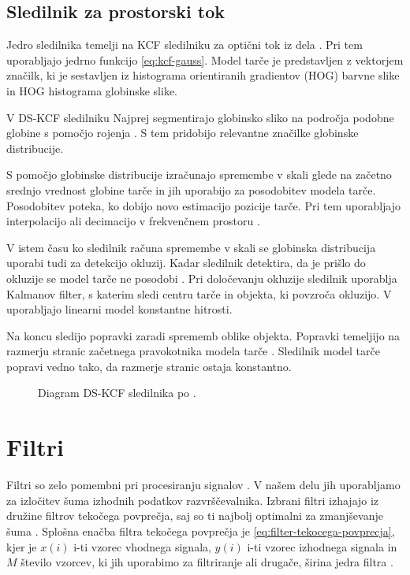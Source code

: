 {\subsection{Sledilnik za prostorski tok}
Jedro sledilnika temelji na KCF sledilniku za optični tok iz dela \cite{henriques2015high}. Pri tem uporabljajo jedrno funkcijo \eqref{eq:kcf-gauss}. Model tarče je predstavljen z vektorjem značilk, ki je sestavljen iz histograma orientiranih gradientov (HOG) barvne slike in HOG histograma globinske slike. 

V DS-KCF sledilniku Najprej segmentirajo globinsko sliko na področja podobne globine s pomočjo rojenja \cite{hannuna2016ds}. S tem pridobijo relevantne značilke globinske distribucije. 

S pomočjo globinske distribucije izračunajo spremembe v skali glede na začetno srednjo vrednost globine tarče in jih uporabijo za posodobitev modela tarče. Posodobitev poteka, ko dobijo novo estimacijo pozicije tarče. Pri tem uporabljajo interpolacijo ali decimacijo v frekvenčnem prostoru \cite{hannuna2016ds}.

V istem času ko sledilnik računa spremembe v skali se globinska distribucija uporabi tudi za detekcijo okluzij. Kadar sledilnik detektira, da je prišlo do okluzije se model tarče ne posodobi \cite{hannuna2016ds}. Pri določevanju okluzije sledilnik uporablja Kalmanov filter, s katerim sledi centru tarče in objekta, ki povzroča okluzijo. V \cite{hannuna2016ds} uporabljajo linearni model konstantne hitrosti.  

Na koncu sledijo popravki zaradi sprememb oblike objekta. Popravki temeljijo na razmerju stranic začetnega pravokotnika modela tarče \cite{hannuna2016ds}. Sledilnik model tarče popravi vedno tako, da razmerje stranic ostaja konstantno.




\begin{figure}[htb]
\centering

\caption{Diagram DS-KCF sledilnika po \cite{hannuna2016ds}.}
\label{fig:diagram-dskcf}
\end{figure}












\section{Filtri}\label{sec:filtri}
Filtri so zelo pomembni pri procesiranju signalov \cite{smith1997scientist}. V našem delu jih uporabljamo za izločitev šuma izhodnih podatkov razvrščevalnika. Izbrani filtri izhajajo iz družine filtrov tekočega povprečja, saj so ti najbolj optimalni za zmanjševanje šuma \cite{smith1997scientist}. Splošna enačba filtra tekočega povprečja je \eqref{eq:filter-tekocega-povprecja}, kjer je $x(i)$ i-ti vzorec vhodnega signala, $y(i)$ i-ti vzorec izhodnega signala in $M$ število vzorcev, ki jih uporabimo za filtriranje ali drugače, širina jedra filtra \cite{smith1997scientist}.

}
